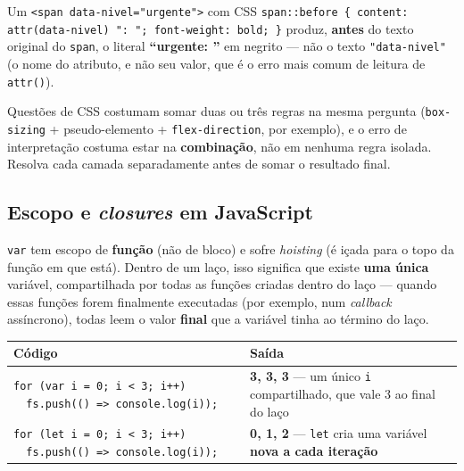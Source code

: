 \begin{exemplo}
Um \texttt{<span data-nivel="urgente">} com CSS
\texttt{span::before \{ content: attr(data-nivel) ": "; font-weight:
bold; \}} produz, \textbf{antes} do texto original do \texttt{span}, o
literal \textbf{“urgente: ”} em negrito --- não o texto
\texttt{"data-nivel"} (o nome do atributo, e não seu valor, que é o erro
mais comum de leitura de \texttt{attr()}).
\end{exemplo}

\begin{cuidado}
Questões de CSS costumam somar duas ou três regras na mesma pergunta
(\texttt{box-sizing} + pseudo-elemento + \texttt{flex-direction}, por
exemplo), e o erro de interpretação costuma estar na \textbf{combinação},
não em nenhuma regra isolada. Resolva cada camada separadamente antes de
somar o resultado final.
\end{cuidado}

\subsection{Escopo e \textit{closures} em JavaScript}

\begin{conceito}
\texttt{var} tem escopo de \textbf{função} (não de bloco) e sofre
\textit{hoisting} (é içada para o topo da função em que está). Dentro de
um laço, isso significa que existe \textbf{uma única} variável,
compartilhada por todas as funções criadas dentro do laço --- quando
essas funções forem finalmente executadas (por exemplo, num
\textit{callback} assíncrono), todas leem o valor \textbf{final} que a
variável tinha ao término do laço.

\begin{center}
\begin{tabular}{@{}p{5.4cm}p{5.4cm}@{}}
\toprule
\textbf{Código} & \textbf{Saída} \\
\midrule
\texttt{for (var i = 0; i < 3; i++)} \newline \texttt{\ \
fs.push(() => console.log(i));} & \textbf{3, 3, 3} --- um único \texttt{i}
compartilhado, que vale 3 ao final do laço \\
\texttt{for (let i = 0; i < 3; i++)} \newline \texttt{\ \
fs.push(() => console.log(i));} & \textbf{0, 1, 2} --- \texttt{let} cria
uma variável \textbf{nova a cada iteração} \\
\bottomrule
\end{tabular}
\end{center}
\end{conceito}

